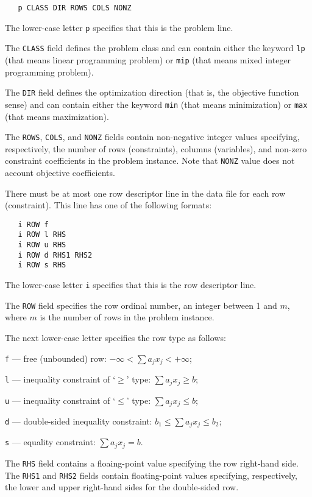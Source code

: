 \begin{verbatim}
   p CLASS DIR ROWS COLS NONZ
\end{verbatim}

The lower-case letter \verb|p| specifies that this is the problem line.

The \verb|CLASS| field defines the problem class and can contain either
the keyword \verb|lp| (that means linear programming problem) or
\verb|mip| (that means mixed integer programming problem).

The \verb|DIR| field defines the optimization direction (that is, the
objective function sense) and can contain either the keyword \verb|min|
(that means minimization) or \verb|max| (that means maximization).

The \verb|ROWS|, \verb|COLS|, and \verb|NONZ| fields contain
non-negative integer values specifying, respectively, the number of
rows (constraints), columns (variables), and non-zero constraint
coefficients in the problem instance. Note that \verb|NONZ| value does
not account objective coefficients.

 There must be at most one row descriptor line
in the data file for each row (constraint). This line has one of the
following formats:

\begin{verbatim}
   i ROW f
   i ROW l RHS
   i ROW u RHS
   i ROW d RHS1 RHS2
   i ROW s RHS
\end{verbatim}

The lower-case letter \verb|i| specifies that this is the row
descriptor line.

The \verb|ROW| field specifies the row ordinal number, an integer
between 1 and $m$, where $m$ is the number of rows in the problem
instance.

The next lower-case letter specifies the row type as follows:

\verb|f| --- free (unbounded) row: $-\infty<\sum a_jx_j<+\infty$;

\verb|l| --- inequality constraint of `$\geq$' type:
$\sum a_jx_j\geq b$;

\verb|u| --- inequality constraint of `$\leq$' type:
$\sum a_jx_j\leq b$;

\verb|d| --- double-sided inequality constraint:
$b_1\leq\sum a_jx_j\leq b_2$;

\verb|s| --- equality constraint: $\sum a_jx_j=b$.

The \verb|RHS| field contains a floaing-point value specifying the
row right-hand side. The \verb|RHS1| and \verb|RHS2| fields contain
floating-point values specifying, respectively, the lower and upper
right-hand sides for the double-sided row.

